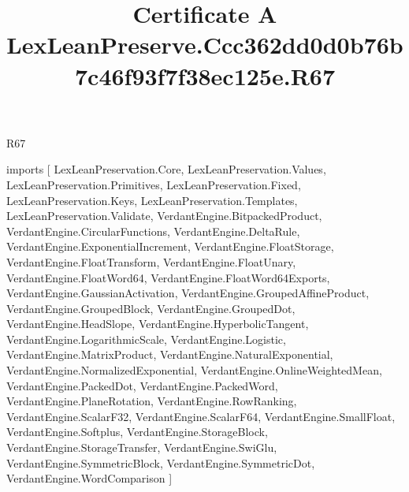 \begin{lexlean}{R67}
\title{Certificate A LexLeanPreserve.Ccc362dd0d0b76b7c46f93f7f38ec125e.R67}
\begin{coremodule}
imports [
  LexLeanPreservation.Core,
  LexLeanPreservation.Values,
  LexLeanPreservation.Primitives,
  LexLeanPreservation.Fixed,
  LexLeanPreservation.Keys,
  LexLeanPreservation.Templates,
  LexLeanPreservation.Validate,
  VerdantEngine.BitpackedProduct,
  VerdantEngine.CircularFunctions,
  VerdantEngine.DeltaRule,
  VerdantEngine.ExponentialIncrement,
  VerdantEngine.FloatStorage,
  VerdantEngine.FloatTransform,
  VerdantEngine.FloatUnary,
  VerdantEngine.FloatWord64,
  VerdantEngine.FloatWord64Exports,
  VerdantEngine.GaussianActivation,
  VerdantEngine.GroupedAffineProduct,
  VerdantEngine.GroupedBlock,
  VerdantEngine.GroupedDot,
  VerdantEngine.HeadSlope,
  VerdantEngine.HyperbolicTangent,
  VerdantEngine.LogarithmicScale,
  VerdantEngine.Logistic,
  VerdantEngine.MatrixProduct,
  VerdantEngine.NaturalExponential,
  VerdantEngine.NormalizedExponential,
  VerdantEngine.OnlineWeightedMean,
  VerdantEngine.PackedDot,
  VerdantEngine.PackedWord,
  VerdantEngine.PlaneRotation,
  VerdantEngine.RowRanking,
  VerdantEngine.ScalarF32,
  VerdantEngine.ScalarF64,
  VerdantEngine.SmallFloat,
  VerdantEngine.Softplus,
  VerdantEngine.StorageBlock,
  VerdantEngine.StorageTransfer,
  VerdantEngine.SwiGlu,
  VerdantEngine.SymmetricBlock,
  VerdantEngine.SymmetricDot,
  VerdantEngine.WordComparison
]


\end{coremodule}
\end{lexlean}
